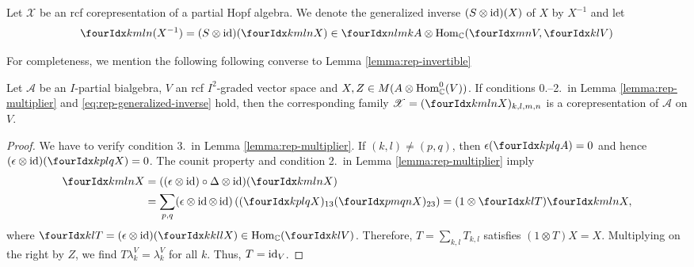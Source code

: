 \begin{Def}
  Let $\mathscr{X}$ be an rcf corepresentation of a  partial Hopf
  algebra.  We  denote the generalized inverse $(S \otimes \operatorname{id})(X)$
  of $X$  by $X^{-1}$ and let
  \begin{align*}
   \Gr{(X^{-1})}{k}{l}{m}{n}=(S \otimes \id)(\Gr{X}{k}{l}{m}{n}) \in
   \Gr{A}{n}{m}{l}{k} \otimes \Hom_{\C}(\Gru{V}{m}{n},\Gru{V}{k}{l})
  \end{align*}
\end{Def}
For completeness, we mention the following following converse to Lemma \ref{lemma:rep-invertible}
\begin{Lem}
  Let $\mathscr{A}$ be an $I$-partial bialgebra, $V$ an rcf $I^{2}$-graded vector space and $X,Z \in M(A \otimes
  \operatorname{Hom}_{\mathbb{C}}^{0}(V))$. If conditions 0.--2.\ in Lemma
  \ref{lemma:rep-multiplier} and
  \eqref{eq:rep-generalized-inverse} hold, then the corresponding
  family $\mathscr{X}=(\Gr{X}{k}{l}{m}{n})_{k,l,m,n}$ is a
  corepresentation of $\mathscr{A}$ on $V$.
\end{Lem}
\begin{proof}
  We have to verify condition 3.\ in Lemma
  \ref{lemma:rep-multiplier}.  If $(k,l) \neq (p,q)$, then
  $\epsilon(\Gr{A}{k}{l}{p}{q})=0$ and hence $(\epsilon
  \otimes \id)(\Gr{X}{k}{l}{p}{q}) =0$. The counit property and condition
  2.\ in Lemma \ref{lemma:rep-multiplier} imply 
\begin{align*}
  \Gr{X}{k}{l}{m}{n} &= ((\epsilon\otimes \id)\circ  \Delta \otimes
  \id)(  \Gr{X}{k}{l}{m}{n}) 
\\ &  = \sum_{p,q} (\epsilon\otimes \id \otimes
  \id)\left((\Gr{X}{k}{l}{p}{q})_{13}(\Gr{X}{p}{q}{m}{n})_{23}\right)
  =  (1 \otimes \Gru{T}{k}{l})\Gr{X}{k}{l}{m}{n},
\end{align*}
where $\Gru{T}{k}{l}=(\epsilon \otimes \id)(\Gr{X}{k}{l}{k}{l}) \in
\Hom_{\C}(\Gru{V}{k}{l})$.  Therefore,  $T=\sum_{k,l} T_{k,l}$  satisfies $(1 \otimes T)X =
X$. Multiplying on the right by $Z$, we find
$T\lambda^{V}_{k}=\lambda^{V}_{k}$ for all $k$. Thus, $T=\operatorname{id}_{V}$.
\end{proof}

